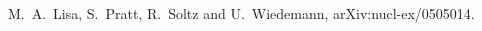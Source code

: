 \documentclass[10pt]{article}
\begin{document}
\begin{thebibliography}{99}

M.~A.~Lisa, S.~Pratt, R.~Soltz and U.~Wiedemann,
  arXiv:nucl-ex/0505014.

\end{thebibliography}
\end{document}
